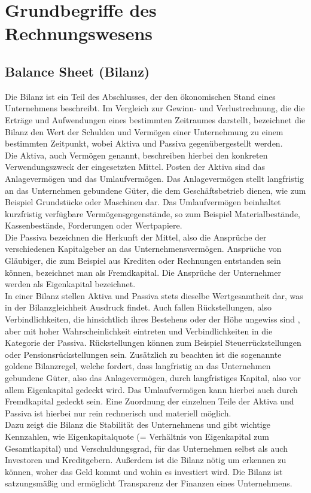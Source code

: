 ﻿%
\section{Grundbegriffe des Rechnungswesens}

\subsection{Balance Sheet (Bilanz)}
Die Bilanz ist ein Teil des Abschlusses, der den ökonomischen Stand eines Unternehmens beschreibt. Im Vergleich zur Gewinn- und Verlustrechnung, die die Erträge und Aufwendungen eines bestimmten Zeitraumes darstellt, bezeichnet die Bilanz den Wert der Schulden und Vermögen einer Unternehmung zu einem bestimmten Zeitpunkt, wobei Aktiva und Passiva gegenübergestellt werden.\cite{businesson}
\\
Die Aktiva, auch Vermögen genannt, beschreiben hierbei den konkreten Verwendungszweck der eingesetzten Mittel. Posten der Aktiva sind das Anlagevermögen und das Umlaufvermögen. Das Anlagevermögen stellt langfristig an das Unternehmen gebundene Güter, die dem Geschäftsbetrieb dienen, wie zum Beispiel Grundstücke oder Maschinen dar. Das Umlaufvermögen beinhaltet kurzfristig verfügbare Vermögensgegenstände, so zum Beispiel Materialbestände, Kassenbestände, Forderungen oder Wertpapiere.
\\
Die Passiva bezeichnen die Herkunft der Mittel, also die Ansprüche der verschiedenen Kapitalgeber an das Unternehmensvermögen. Ansprüche von Gläubiger, die zum Beispiel aus Krediten oder Rechnungen entstanden sein können, bezeichnet man als Fremdkapital. Die Ansprüche der Unternehmer werden als Eigenkapital bezeichnet.\cite{bilanz}
\\
In einer Bilanz stellen Aktiva und Passiva stets dieselbe Wertgesamtheit dar, was in der Bilanzgleichheit Ausdruck findet. Auch fallen Rückstellungen, also Verbindlichkeiten, die hinsichtlich ihres Bestehens oder der Höhe ungewiss sind \cite{rueckstellung}, aber mit hoher Wahrscheinlichkeit eintreten und Verbindlichkeiten in die Kategorie der Passiva. Rückstellungen können zum Beispiel Steuerrückstellungen oder Pensionsrückstellungen sein. Zusätzlich zu beachten ist die sogenannte goldene Bilanzregel, welche fordert, dass langfristig an das Unternehmen gebundene Güter, also das Anlagevermögen, durch langfristiges Kapital, also vor allem Eigenkapital gedeckt wird. Das Umlaufvermögen kann hierbei auch durch Fremdkapital gedeckt sein. Eine Zuordnung der einzelnen Teile der Aktiva und Passiva ist hierbei nur rein rechnerisch und materiell möglich.\cite{bilanzregel}
\\
Dazu zeigt die Bilanz die Stabilität des Unternehmens und gibt wichtige Kennzahlen, wie Eigenkapitalquote (= Verhältnis von Eigenkapital zum Gesamtkapital) und Verschuldungsgrad, für das Unternehmen selbst als auch Investoren und Kreditgebern.\cite{businesson} Außerdem ist die Bilanz nötig um erkennen zu können, woher das Geld kommt und wohin es investiert wird. Die Bilanz ist satzungsmäßig und ermöglicht Transparenz der Finanzen eines Unternehmens.

